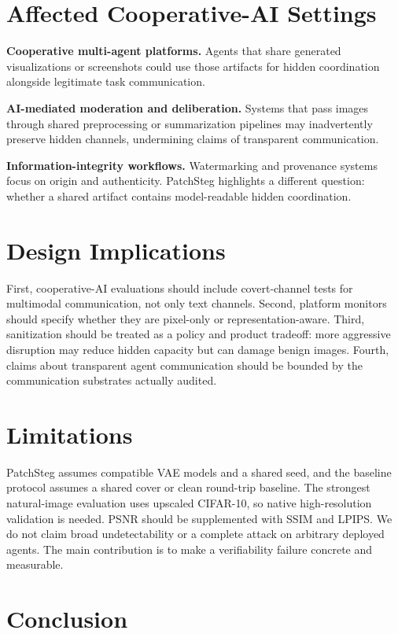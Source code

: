\documentclass{article}
\begin{document}
\section{Affected Cooperative-AI Settings}

\textbf{Cooperative multi-agent platforms.}
Agents that share generated visualizations or screenshots could use those artifacts for hidden coordination alongside legitimate task communication.

\textbf{AI-mediated moderation and deliberation.}
Systems that pass images through shared preprocessing or summarization pipelines may inadvertently preserve hidden channels, undermining claims of transparent communication.

\textbf{Information-integrity workflows.}
Watermarking and provenance systems focus on origin and authenticity. PatchSteg highlights a different question: whether a shared artifact contains model-readable hidden coordination.

\section{Design Implications}

First, cooperative-AI evaluations should include covert-channel tests for multimodal communication, not only text channels. Second, platform monitors should specify whether they are pixel-only or representation-aware. Third, sanitization should be treated as a policy and product tradeoff: more aggressive disruption may reduce hidden capacity but can damage benign images. Fourth, claims about transparent agent communication should be bounded by the communication substrates actually audited.

\section{Limitations}

PatchSteg assumes compatible VAE models and a shared seed, and the baseline protocol assumes a shared cover or clean round-trip baseline. The strongest natural-image evaluation uses upscaled CIFAR-10, so native high-resolution validation is needed. PSNR should be supplemented with SSIM and LPIPS. We do not claim broad undetectability or a complete attack on arbitrary deployed agents. The main contribution is to make a verifiability failure concrete and measurable.

\section{Conclusion}
\end{document}
